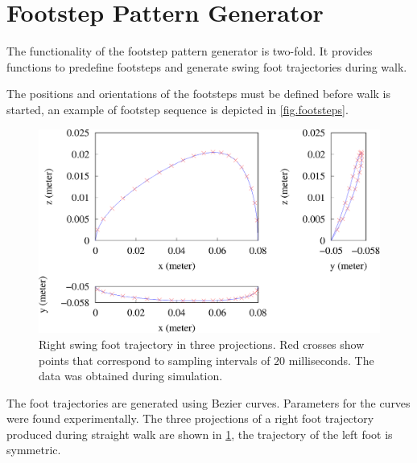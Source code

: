 \section{Footstep Pattern Generator}
The functionality of the footstep pattern generator is two-fold. It provides
functions to predefine footsteps and generate swing foot trajectories during 
walk.

The positions and orientations of the footsteps must be defined before walk is
started, an example of footstep sequence is depicted in \cref{fig.footsteps}. 

\begin{figure}[ht]
    \centerline{%
    \includegraphics[scale=0.5]{Figures/foottraj.eps}}
    \caption[Swing foot trajectory]{Right swing foot trajectory in three
    projections. Red crosses show points that correspond to sampling intervals
    of $20$ milliseconds. The data was obtained during simulation.}
    \label{fig.foottraj}
\end{figure}

The foot trajectories are generated using Bezier curves. Parameters for the curves
were found experimentally. The three projections of a right foot trajectory produced
during straight walk are shown in \cref{fig.foottraj}, the trajectory of the left 
foot is symmetric.



